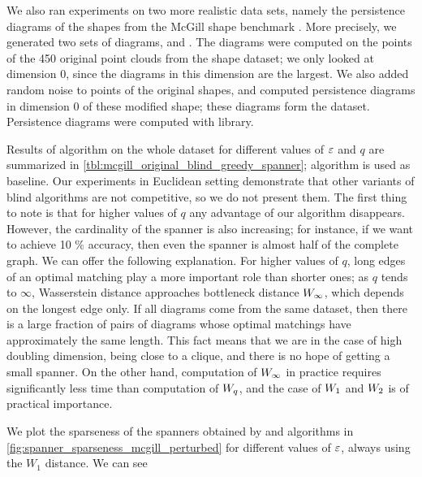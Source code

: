 \documentclass[a4paper,UKenglish,cleveref, autoref]{lipics-v2019}
\begin{document}
We also ran experiments on two more realistic data sets,
namely the persistence diagrams of the shapes 
from  the McGill shape benchmark \cite{zhang2005mcgill}. 
More precisely, we generated two sets of diagrams,
 and . The 
diagrams were computed on the points of the 450 original
point clouds from the shape dataset; we only looked
at dimension 0, since the diagrams in this dimension are the largest.
We also added random noise to points of the original shapes,
and computed persistence diagrams in dimension 0 of these modified
shape; these diagrams form the  dataset.
Persistence diagrams were computed with 
library.



Results of \bgrdy algorithm on the whole  dataset 
for different values of $\varepsilon$ and $q$ are summarized in \cref{tbl:mcgill_original_blind_greedy_spanner};
\grdy algorithm is used as baseline. Our experiments in Euclidean setting
demonstrate that other variants of blind algorithms are not competitive,
so we do not present them. The first thing to note is that for higher values of $q$
any advantage of our algorithm disappears. However, the cardinality of the \grdy
spanner is also increasing; for instance, if we want to achieve 10 \% accuracy,
then even the \grdy spanner is almost half of the complete graph.
We can offer the following explanation. For higher values of $q$,
long edges of an optimal matching play a more important role
than shorter ones; as $q$ tends to $\infty$, Wasserstein distance
approaches bottleneck distance ${W_\infty}$, which depends on the longest
edge only. If all diagrams come from the same dataset,
then there is a large fraction of pairs of diagrams whose optimal matchings
have approximately the same length. This fact means that we are in the case
of high doubling dimension, being close to a clique, and there is no hope
of getting a small spanner. On the other hand, computation of ${W_\infty}$ in practice
requires significantly less time than computation of ${W_{q}}$, and the case
of ${W_{1}}$ and ${W_{2}}$ is of practical importance.




We plot the sparseness of the spanners obtained by \grdy
and \bgrdy algorithms in \cref{fig:spanner_sparseness_mcgill_perturbed}
for different values of $\varepsilon$, always using the $W_1$ distance.
We can see
\end{document}
